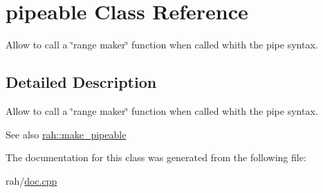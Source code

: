 \hypertarget{classpipeable}{}\section{pipeable Class Reference}
\label{classpipeable}


Allow to call a \char`\"{}range maker\char`\"{} function when called whith the \textquotesingle{}pipe\textquotesingle{} syntax.  




\subsection{Detailed Description}
Allow to call a \char`\"{}range maker\char`\"{} function when called whith the \textquotesingle{}pipe\textquotesingle{} syntax. 

\begin{DoxySeeAlso}{See also}
\mbox{\hyperlink{namespacerah_a274b78c4c0af5dd58ce280f02223fb55}{rah\+::make\+\_\+pipeable}} 
\end{DoxySeeAlso}


The documentation for this class was generated from the following file\+:\begin{DoxyCompactItemize}
\item 
rah/\mbox{\hyperlink{doc_8cpp}{doc.\+cpp}}\end{DoxyCompactItemize}
